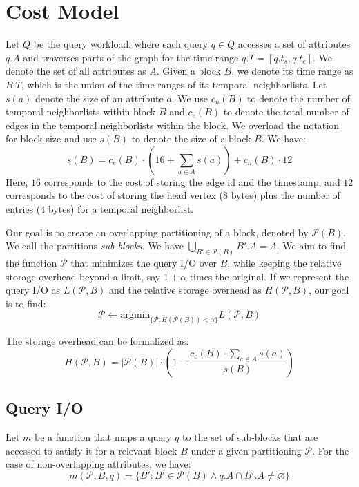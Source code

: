 \documentclass[twocolumn]{svjour3}          %
\let\emptyset\varnothing
\begin{document}
\section{Cost Model}
Let $Q$ be the query workload, where each query $q\in Q$ accesses a set of
attributes $q.A$ and traverses parts of the graph for the time range
$q.T=[q.t_s,q.t_e]$. We denote the set of all attributes as $A$. Given a block
$B$, we denote its time range as $B.T$, which is the union of the time ranges
of its temporal neighborlists. Let $s(a)$ denote the size of an attribute $a$.
We use $c_n(B)$ to denote the number of temporal neighborlists within block
$B$ and $c_e(B)$ to denote the total number of edges in the temporal
neighborlists within the block. We overload the notation for block size and
use $s(B)$ to denote the size of a block $B$. We have: 
\begin{equation}
s(B) = c_e(B) \cdot \left(16 + \sum_{a\in A} s(a)\right) + c_n(B) \cdot 12  
\end{equation}
Here, $16$ corresponds to the cost of storing the edge id and the timestamp,
and $12$ corresponds to the cost of storing the head vertex ($8$ bytes) plus
the number of entries ($4$ bytes) for a temporal neighborlist. 

Our goal is to create an overlapping partitioning of a block, denoted by
$\mathcal{P}(B)$. We call the partitions \emph{sub-blocks}. We have
$\bigcup_{B'\in \mathcal{P}(B)} B'.A = A$. We aim to find the function
$\mathcal{P}$ that minimizes the query I/O over $B$, while keeping the
relative storage overhead beyond a limit, say $1+\alpha$ times the original.
If we represent the query I/O as $L(\mathcal{P}, B)$ and the relative storage
overhead as $H(\mathcal{P}, B)$, our goal is to find:
\begin{equation}
\mathcal{P} \leftarrow \mbox{argmin}_{\{\mathcal{P}: H(\mathcal{P}(B)) < \alpha\}} L(\mathcal{P},B)
\end{equation}

The storage overhead can be formalized as:
\begin{equation}
H(\mathcal{P}, B) = |\mathcal{P}(B)|\cdot\left(1-\frac{c_e(B)\cdot \sum_{a\in A} s(a)}{s(B)}\right) 
\end{equation}

\subsection{Query I/O}

Let $m$ be a function that maps a query $q$ to the set of sub-blocks that are
accessed to satisfy it for a relevant block $B$ under a given partitioning
$\mathcal{P}$. For the case of non-overlapping attributes, we have:
\begin{equation}
m(\mathcal{P}, B, q) = \{B': B'\in \mathcal{P}(B) \wedge q.A \cap B'.A \ne \emptyset\}  
\end{equation}
\end{document}
